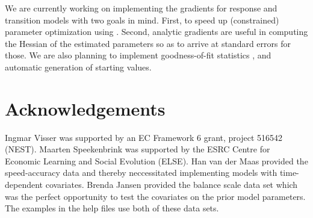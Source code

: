 \documentclass[article]{jss}
\begin{document}
We are currently working on implementing the gradients for response
and transition models with two goals in mind.  First, to speed up
(constrained) parameter optimization using .  Second,
analytic gradients are useful in computing the Hessian of the
estimated parameters so as to arrive at standard errors for those.  We
are also planning to implement goodness-of-fit statistics
\citep{Titman2008}, and automatic generation of starting values.


\section*{Acknowledgements} 

Ingmar Visser was supported by an EC Framework 6 grant, project 516542
(NEST).  Maarten Speekenbrink was supported by the ESRC Centre for
Economic Learning and Social Evolution (ELSE).  Han van der Maas
provided the speed-accuracy data \cite{Dutilh2009} and thereby
neccessitated implementing models with time-dependent covariates.
Brenda Jansen provided the balance scale data set \citep{Jansen2002}
which was the perfect opportunity to test the covariates on the prior
model parameters.  The examples in the help files use both of these
data sets.


\end{document}
